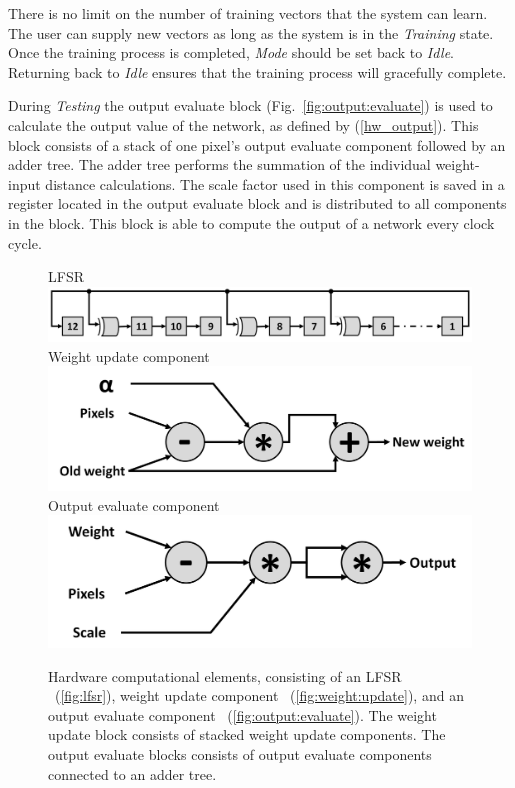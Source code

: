 \documentclass[10pt,journal]{IEEEtran}
\newcommand{\fig}[1]{Fig.~\ref{#1}}
\newcommand{\subfig}[1]{~(\ref{#1})}
\newcommand{\eq}[1]{(\ref{#1})}
\begin{document}
			There is no limit on the number of training vectors that the system can learn. The user can supply new vectors as long as the system is in the \textit{Training} state. Once the training process is completed, \textit{Mode} should be set back to \textit{Idle}. Returning back to \textit{Idle} ensures that the training process will gracefully complete.
			
			During \textit{Testing} the output evaluate block (\fig{fig:output:evaluate}) is used to calculate the output value of the network, as defined by \eq{hw_output}. This block consists of a stack of one pixel's output evaluate component followed by an adder tree. The adder tree performs the summation of the individual weight-input distance calculations. The scale factor used in this component is saved in a register located in the output evaluate block and is distributed to all components in the block. This block is able to compute the output of a network every clock cycle.
			
			\begin{figure}[t]
				\captionsetup[subfigure]{position=b}
				\centering
				\hfill
				\subcaptionbox
				{
					LFSR
					\label{fig:lfsr}
				}
				{\includegraphics[width=0.9\columnwidth]{LFSR}}
				\hfill
				\subcaptionbox
				{
					Weight update component
					\label{fig:weight:update}
				}
				{\includegraphics[width=0.9\columnwidth]{Weight_update}}
				\hfill
				\subcaptionbox
				{
					Output evaluate component
					\label{fig:output:evaluate}
				}
				{\includegraphics[width=0.9\columnwidth]{Ouput_evaluate}}
				\hfill
				\caption{Hardware computational elements, consisting of an LFSR \subfig{fig:lfsr}, weight update component \subfig{fig:weight:update}, and an output evaluate component \subfig{fig:output:evaluate}. The weight update block consists of stacked weight update components. The output evaluate blocks consists of output evaluate components connected to an adder tree.}
				\label{fig:computational_elements}
			\end{figure}
			
\end{document}
